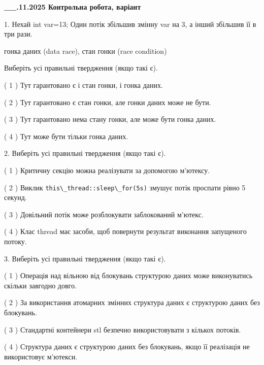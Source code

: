 \documentclass[12pt, ukrainian]{article}
\def\code#1{\Verb!#1!}
\begin{document}
\newpage
\begin {large}

\textbf{\_\_.11.2025 Контрольна робота, варіант  }\par


{
1. Нехай int var=13; Один потік збільшив змінну var на 3, а інший збільшив її в три рази.

гонка даних (data race), стан гонки (race condition)

Виберіть усі правильні твердження (якщо такі є).\par
\vspace{2mm}
( 1 ) Тут гарантовано є і стан гонки, і гонка даних.%

( 2 ) Тут гарантовано є стан гонки, але гонки даних може не бути.%

( 3 ) Тут гарантовано нема стану гонки, але може бути гонка даних.%

( 4 ) Тут може бути тільки гонка даних.%


2. Виберіть усі правильні твердження (якщо такі є).\par
\vspace{2mm}

( 1 ) Критичну секцію можна реалізувати за допомогою м’ютексу.%

( 2 ) Виклик \code{this\_thread::sleep\_for(5s)} змушує потік проспати рівно 5 секунд.%

( 3 ) Довільний потік може розблокувати заблокований м’ютекс.%

( 4 ) Клас thread має засоби, щоб повернути результат виконання запущеного потоку.%


3. Виберіть усі правильні твердження (якщо такі є).\par
\vspace{2mm}

( 1 ) Операція над вільною від блокувань структурою даних може виконуватись скільки завгодно довго.%

( 2 ) За використання атомарних змінних структура даних є структурою даних без блокувань.%

( 3 ) Стандартні контейнери stl безпечно використовувати з кількох потоків.%

( 4 ) Структура даних є структурою даних без блокувань, якщо її реалізація не використовує м’ютекси.%


}
\end{large}
\end{document}
